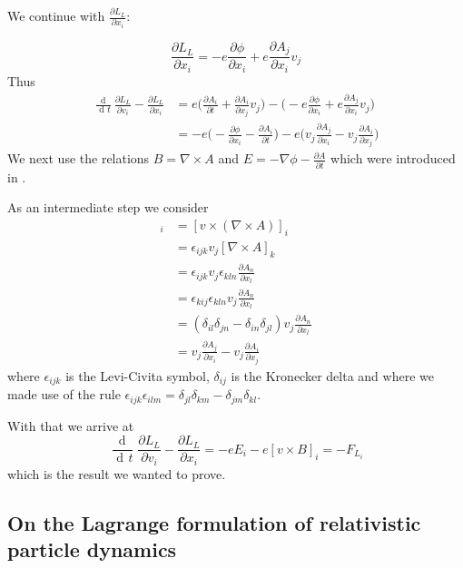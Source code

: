\documentclass{article}
\DeclareMathOperator{\dd}{d\!}
\begin{document}
We continue with $\frac{\partial L_L}{\partial x_i}$:

\begin{equation}
    \frac{\partial L_L}{\partial x_i} = -e \frac{\partial \phi}{\partial x_i} + e \frac{\partial A_j}{\partial x_i} v_j
\end{equation}
Thus
\begin{align}
    \frac{\dd}{\dd t} \frac{\partial L_L}{\partial v_i} - \frac{\partial L_L}{\partial x_i}
    & = e \bigg(\frac{\partial A_i}{\partial t} + \frac{\partial A_i}{\partial x_j} v_j\bigg)
    - \bigg( -e \frac{\partial \phi}{\partial x_i} + e \frac{\partial A_j}{\partial x_i} v_j \bigg) \nonumber \\
    & = - e \bigg( -\frac{\partial \phi}{\partial x_i} - \frac{\partial A_i}{\partial t} \bigg)
    - e \bigg( v_j \frac{\partial A_j}{\partial x_i}  - v_j \frac{\partial A_i}{\partial x_j}  \bigg)
\end{align}
We next use the relations $B = \nabla \times A$ and $E = - \nabla \phi - \frac{\partial A}{\partial t}$ which were introduced in  \cite{LagrangeOfField}.

As an intermediate step we consider
\begin{align}
[v \times B]_i &= [v \times (\nabla \times A)]_i \nonumber \\
&=\epsilon_{ijk} v_j [\nabla \times A]_k \nonumber \\
&=\epsilon_{ijk} v_j \epsilon_{kln} \frac{\partial A_n}{\partial x_l} \nonumber \\
&=\epsilon_{kij} \epsilon_{kln} v_j  \frac{\partial A_n}{\partial x_l} \nonumber \\
&=(\delta_{il} \delta_{jn} - \delta_{in} \delta_{jl} ) v_j  \frac{\partial A_n}{\partial x_l} \nonumber \\
&=v_j \frac{\partial A_j}{\partial x_i} - v_j \frac{\partial A_i}{\partial x_j} \nonumber
\end{align}
where $\epsilon_{ijk}$ is the Levi-Civita symbol, $\delta_{ij}$ is the Kronecker delta and where we made use of the rule
$\epsilon_{ijk} \epsilon_{ilm} = \delta_{jl}\delta_{km} - \delta_{jm}\delta_{kl}$.

With that we arrive at
\begin{equation}
    \frac{\dd}{\dd t} \frac{\partial L_L}{\partial v_i} - \frac{\partial L_L}{\partial x_i}
    = - e E_i - e [v \times B]_i = -F_L_i
\end{equation}
which is the result we wanted to prove.

\subsection{On the Lagrange formulation of relativistic particle dynamics} \label{sectionOnRelativisticParticles}
\end{document}

